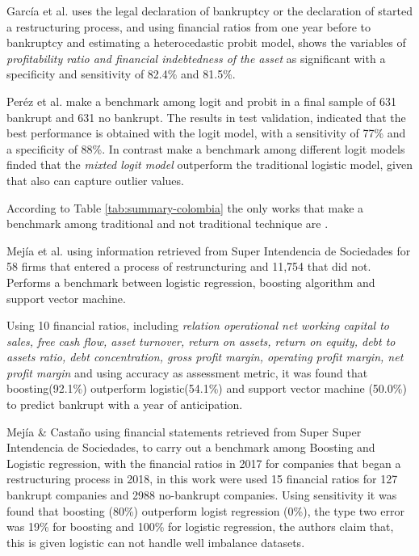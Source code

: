 \documentclass[journal]{IEEEtai}
\begin{document}
García et al. \cite{C1} uses the legal declaration of bankruptcy or the declaration of started a  restructuring process, and using financial ratios from one year before to bankruptcy and estimating a heterocedastic probit model, shows the variables of \textit{profitability ratio and financial indebtedness of the asset} as significant with a specificity and sensitivity of 82.4\% and 81.5\%.

Peréz et al. \cite{C13} make a benchmark among logit and probit in a final sample of 631 bankrupt and 631 no bankrupt. The results in test validation, indicated that the best performance is obtained with the logit model, with a sensitivity of 77\% and a specificity of 88\%.   In contrast \cite{C16} make a benchmark among different logit models  finded that the \textit{mixted logit model} outperform the traditional logistic model, given that also can capture outlier values.

According to Table \ref{tab:summary-colombia} the only works that make a benchmark among traditional and not traditional technique are \cite{C3,C15}.


Mejía et al. \cite{C3} using information retrieved from Super Intendencia de Sociedades for 58 firms that entered a process of restruncturing and  11,754 that did not. Performs a benchmark between logistic regression, boosting algorithm and support vector machine.

Using 10 financial ratios, including \textit{relation operational net working capital to sales, free cash flow, asset turnover, return on assets, return on equity, debt to assets ratio, debt concentration, gross profit margin, operating profit margin, net profit margin} and using  accuracy as assessment metric,  it was found that boosting(92.1\%) outperform logistic(54.1\%) and support vector machine (50.0\%) to predict bankrupt with a year of anticipation.

Mejía \& Castaño \cite{C15} using financial statements retrieved from Super Super Intendencia de Sociedades, to carry out a benchmark among Boosting and Logistic regression, with the financial ratios in 2017 for companies that began a restructuring process in 2018, in this work were used 15 financial ratios for 127 bankrupt companies and 2988 no-bankrupt companies.  Using sensitivity it was found that boosting (80\%) outperform logist regression (0\%), the type two error was 19\% for boosting and 100\% for logistic regression, the authors claim that, this is given logistic can not handle well imbalance datasets.
\end{document}
